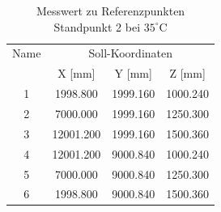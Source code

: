 \begin{table}[h]\label{tab:ausdehnung3}
\centering
\caption{Messwert zu Referenzpunkten Standpunkt 2 bei $35^\circ\text{C}$}

\begin{tabular}{cccc}
\toprule
\multicolumn{1}{c|}{Name} &
\multicolumn{3}{c}{Soll-Koordinaten} \\
\multicolumn{1}{c|}{} &
\multicolumn{1}{c|}{X [mm]} &
\multicolumn{1}{c|}{Y [mm]} &
\multicolumn{1}{c}{Z [mm]} \\
\midrule

\multicolumn{1}{c|}{1} &
\multicolumn{1}{c|}{1998.800} &
\multicolumn{1}{c|}{1999.160} &
\multicolumn{1}{c}{1000.240} \\

\multicolumn{1}{c|}{2} &
\multicolumn{1}{c|}{7000.000} &
\multicolumn{1}{c|}{1999.160} &
\multicolumn{1}{c}{1250.300} \\

\multicolumn{1}{c|}{3} &
\multicolumn{1}{c|}{12001.200} &
\multicolumn{1}{c|}{1999.160} &
\multicolumn{1}{c}{1500.360} \\

\multicolumn{1}{c|}{4} &
\multicolumn{1}{c|}{12001.200} &
\multicolumn{1}{c|}{9000.840} &
\multicolumn{1}{c}{1000.240} \\

\multicolumn{1}{c|}{5} &
\multicolumn{1}{c|}{7000.000} &
\multicolumn{1}{c|}{9000.840} &
\multicolumn{1}{c}{1250.300} \\

\multicolumn{1}{c|}{6} &
\multicolumn{1}{c|}{1998.800} &
\multicolumn{1}{c|}{9000.840} &
\multicolumn{1}{c}{1500.360} \\
\bottomrule
\end{tabular}
\end{table}

